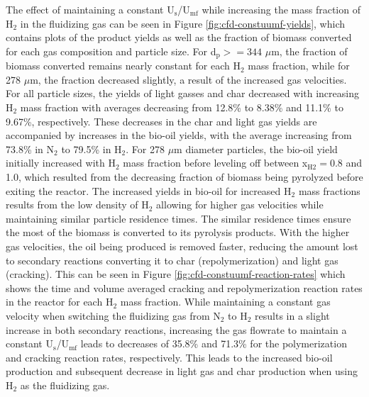 The effect of maintaining a constant U$_\text{s}$/U$_\text{mf}$ while increasing the mass fraction of H$_2$ in the fluidizing gas can be seen in Figure \ref{fig:cfd-constuumf-yields}, which contains plots of the product yields as well as the fraction of biomass converted for each gas composition and particle size. For d$_\text{p} >= 344$ $\mu$m, the fraction of biomass converted remains nearly constant for each H$_2$ mass fraction, while for 278 $\mu$m, the fraction decreased slightly, a result of the increased gas velocities. For all particle sizes, the yields of light gasses and char decreased with increasing H$_2$ mass fraction with averages decreasing from 12.8\% to 8.38\% and 11.1\% to 9.67\%, respectively. These decreases in the char and light gas yields are accompanied by increases in the bio-oil yields, with the average increasing from 73.8\% in N$_2$ to 79.5\% in H$_2$. For 278 $\mu$m diameter particles, the bio-oil yield initially increased with H$_2$ mass fraction before leveling off between x$_\text{H2} = 0.8$ and 1.0, which resulted from the decreasing fraction of biomass being pyrolyzed before exiting the reactor. The increased yields in bio-oil for increased H$_2$ mass fractions results from the low density of H$_2$ allowing for higher gas velocities while maintaining similar particle residence times. The similar residence times ensure the most of the biomass is converted to its pyrolysis products. With the higher gas velocities, the oil being produced is removed faster, reducing the amount lost to secondary reactions converting it to char (repolymerization) and light gas (cracking). This can be seen in Figure \ref{fig:cfd-constuumf-reaction-rates} which shows the time and volume averaged cracking and repolymerization reaction rates in the reactor for each H$_2$ mass fraction. While maintaining a constant gas velocity when switching the fluidizing gas from N$_2$ to H$_2$ results in a slight increase in both secondary reactions, increasing the gas flowrate to maintain a constant U$_\text{s}$/U$_\text{mf}$ leads to decreases of 35.8\% and 71.3\% for the polymerization and cracking reaction rates, respectively. This leads to the increased bio-oil production and subsequent decrease in light gas and char production when using H$_2$ as the fluidizing gas.

